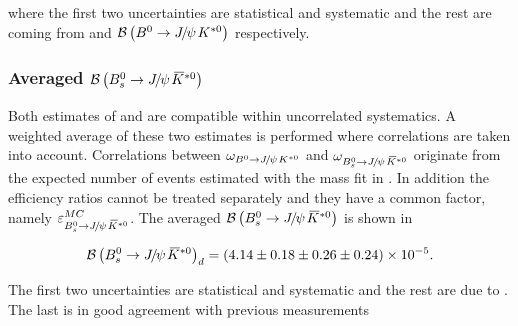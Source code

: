  \noindent where the first two uncertainties are statistical and systematic and the rest are coming from \fdfs and $\BRof\BdJpsiKst$ respectively.

\subsubsection{Averaged $\BRof\BsJpsiKst$}
Both estimates of  and  are compatible within uncorrelated systematics. A weighted average of these two
estimates is performed where correlations are taken into account. Correlations between $\omega_{\BdJpsiKst}$ and $\omega_{\BsJpsiKst}$ originate from the
expected number of events estimated with the mass fit in . In addition the efficiency ratios cannot be treated separately
and they have a common factor, namely $\varepsilon_{\BsJpsiKst}^{MC}$. The averaged  $\BRof\BsJpsiKst$ is shown in 

\begin{equation}
  \centering
\BRof\BsJpsiKst_{d} = (4.14 \pm 0.18 \pm 0.26 \pm 0.24 )\times 10^{-5}.
\label{Br_total}
\end{equation}

\noindent The first two uncertainties are statistical and systematic and the rest are due to \fdfs.
The last is in good agreement with previous measurements~\cite{Aaij:2012nh}
